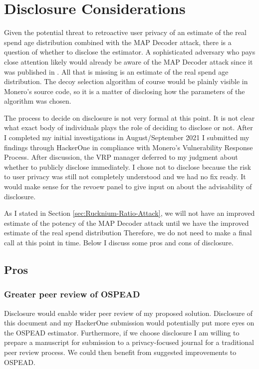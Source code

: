 \documentclass[english]{article}
\begin{document}
\section{Disclosure Considerations\label{sec:Disclosure-Considerations}}

Given the potential threat to retroactive user privacy of an estimate
of the real spend age distribution combined with the MAP Decoder attack,
there is a question of whether to disclose the estimator. A sophisticated
adversary who pays close attention likely would already be aware of
the MAP Decoder attack since it was published in \cite{Aeeneh2021}.
All that is missing is an estimate of the real spend age distribution.
The decoy selection algorithm of course would be plainly visible in
Monero's source code, so it is a matter of disclosing how the parameters
of the algorithm was chosen.

The process to decide on disclosure is not very formal at this point.
It is not clear what exact body of individuals plays the role of deciding
to disclose or not. After I completed my initial investigations in
August/September 2021 I submitted my findings through HackerOne in
compliance with Monero's Vulnerability Response Process. After discussion,
the VRP manager deferred to my judgment about whether to publicly
disclose immediately. I chose not to disclose because the risk to
user privacy was still not completely understood and we had no fix
ready. It would make sense for the revoew panel to give input on about
the advisability of disclosure.

As I stated in Section \ref{sec:Rucknium-Ratio-Attack}, we will not
have an improved estimate of the potency of the MAP Decoder attack
until we have the improved estimate of the real spend distribution
Therefore, we do not need to make a final call at this point in time.
Below I discuss some pros and cons of disclosure.

\subsection{Pros}

\subsubsection{Greater peer review of OSPEAD}

Disclosure would enable wider peer review of my proposed solution.
Disclosure of this document and my HackerOne submission would potentially
put more eyes on the OSPEAD estimator. Furthermore, if we choose disclosure
I am willing to prepare a manuscript for submission to a privacy-focused
journal for a traditional peer review process. We could then benefit
from suggested improvements to OSPEAD.
\end{document}

